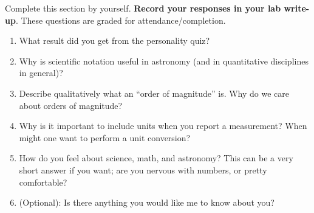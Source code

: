 \documentclass[11pt]{article}
\begin{document}
Complete this section by yourself. \textbf{Record your responses in your lab write-up}. These questions are graded for attendance/completion.
\begin{enumerate}
    \item What result did you get from the personality quiz?
    
    \item Why is scientific notation useful in astronomy (and in quantitative disciplines in general)?
    
    \item Describe qualitatively what an ``order of magnitude'' is. Why do we care about orders of magnitude?
    
    \item Why is it important to include units when you report a measurement? When might one want to perform a unit conversion?

    \item How do you feel about science, math, and astronomy? This can be a very short answer if you want; are you nervous with numbers, or pretty comfortable?

    \item (Optional): Is there anything you would like me to know about you?
    
\end{enumerate}
\end{document}
